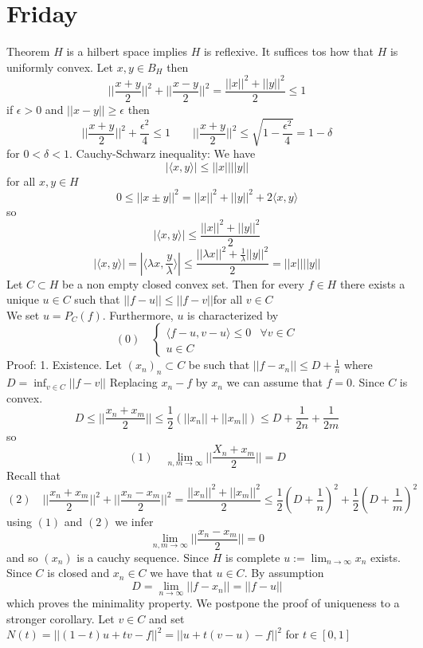 \documentclass[11pt]{article}
\begin{document}
\section{Friday}
Theorem $H $ is a hilbert space implies  $H$ is reflexive. It suffices tos how that  $H$ is uniformly convex. Let  $x,y \in B_H$ then
 \[
||\frac{x+y}{2}||^2 + || \frac{x-y}{2}||^2 = \frac{||x||^2 + ||y||^2}{2} \le 1
\] 
if $\epsilon > 0$ and $||x-y|| \ge \epsilon$ then
\[
||\frac{x+y}{2}||^2 + \frac{\epsilon^2}{4} \le 1  \qquad || \frac{x+y}{2} ||^2 \le \sqrt{1 - \frac{\epsilon^2}{4}} = 1- \delta
\] 
for $0 < \delta < 1$.
Cauchy-Schwarz inequality: We have
\[
|\langle x, y \rangle | \le ||x|| ||y||
\] 
for all $x,y \in H$
 \[
0 \le ||x \pm y ||^2 = ||x||^2 + ||y||^2 + 2 \langle x, y \rangle
\] 
so
\[
| \langle x,y \rangle| \le \frac{||x||^2 + ||y||^2}{2}
\] 
\[
| \langle x ,y \rangle| = | \langle \lambda x, \frac{y}{\lambda} \rangle | \le \frac{|| \lambda x||^2 + \frac{1}{ \lambda} ||y||^2}{2} = ||x|| ||y||
\] 
Let $C \subset H$ be a non empty closed convex set. Then for every $f \in H$ there exists a unique  $ u \in C$ such that  $||f - u|| \le ||f - v|| $for all  $v \in C$\\
We set $u = P_C(f)$. Furthermore,  $u$ is characterized by
 \[
     (0) \quad
         \begin{cases}
             \langle f - u, v - u \rangle \le 0 & \forall v \in C\\
             u \in C
         \end{cases}
\] 
Proof: 1. Existence. Let $(x_n)_n \subset C$ be such that $||f - x_n|| \le D + \frac{1}{n}$ where $D = \inf_{v \in C} || f - v||$
Replacing $x_n -f$ by  $x_n$ we can assume that  $f = 0$. Since  $C$ is convex.
 \[
D \le ||\frac{x_n + x_m}{2}|| \le \frac{1}{2}( ||x_n|| + ||x_m||) \le D + \frac{1}{2n} + \frac{1}{2m}
\] 
so
\[
    (1) \quad \lim_{n,m \to \infty} || \frac{ X_n + x_m}{2} || = D
\] 
Recall that
\[
    (2) \quad || \frac{x_n + x_m}{2}||^2  + || \frac{x_n - x_m}{2} ||^2 = \frac{||x_n||^2 + ||x_m||^2}{2} \le \frac{1}{2}(D + \frac{1}{n})^2 + \frac{1}{2}(D + \frac{1}{m})^2
\] 
using $(1)$ and $(2)$ we infer
 \[
\lim_{n,m\to \infty} || \frac{x_n - x_m}{2} || = 0
\] 
and so $(x_n)$ is a cauchy sequence. Since  $H$ is complete $u := \lim_{n\to \infty}x_n$ exists.
Since $C$ is closed and $x_n \in C$ we have that  $u \in C$.
By assumption 
 \[
D = \lim_{n\to \infty}|| f - x_n|| = || f- u||
\] 
which proves the minimality property. We postpone the proof of uniqueness to a stronger corollary.
Let $v \in C$ and set  $N(t) = ||  (1-t)u + tv - f||^2 = || u + t(v-u) - f||^2$ for $t \in [0,1]$
\end{document}
